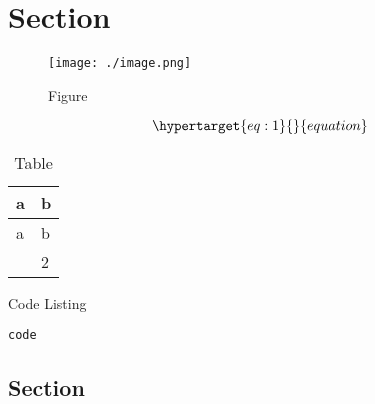 \hypertarget{section}{%
\section{Section}\label{section}}

\begin{figure}
\hypertarget{fig:1}{%
\centering
\texttt{[image: ./image.png]}
\caption{Figure}\label{fig:1}
}
\end{figure}

\begin{equation}\protect\hypertarget{eq:1}{}{equation}\label{eq:1}\end{equation}

\hypertarget{tbl:1}{}
\begin{longtable}[]{@{}ll@{}}
\caption{\label{tbl:1}Table}\tabularnewline
\toprule\noalign{}
a & b \\
\midrule\noalign{}
\endfirsthead
\toprule\noalign{}
a & b \\
\midrule\noalign{}
\endhead
\bottomrule\noalign{}
\endlastfoot
1 & 2 \\
\end{longtable}

\begin{codelisting}

\caption{Code Listing}

\hypertarget{lst:1}{%
\label{lst:1}}%
\begin{verbatim}
code
\end{verbatim}

\end{codelisting}

\hypertarget{section-1}{%
\subsection{Section}\label{section-1}}
